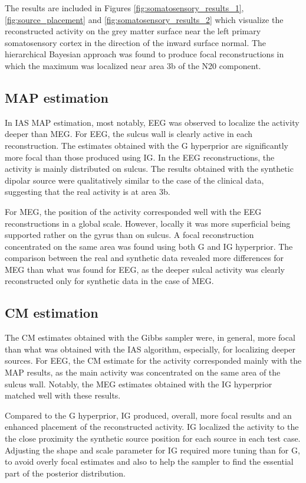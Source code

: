 \documentclass[5p]{elsarticle}
\begin{document}
The results are included in Figures \ref{fig:somatosensory_results_1}, \ref{fig:source_placement} and \ref{fig:somatosensory_results_2} which visualize the reconstructed activity on the grey matter surface near the left primary somatosensory cortex in the direction of the inward surface normal. The hierarchical Bayesian approach was found to produce focal reconstructions in which the maximum was localized near area 3b of the N20 component. 

\subsection{MAP estimation}

In IAS MAP estimation, most notably, EEG was observed to localize the activity deeper than MEG. For EEG, the sulcus wall is clearly active in each reconstruction. The estimates obtained with the G hyperprior are significantly more focal than those produced using IG. In the EEG 
reconstructions, the activity is mainly distributed on sulcus. 
The results obtained with the synthetic dipolar source were qualitatively similar to the case of the clinical data, suggesting that the real activity is at area 3b. 

For MEG, the position of the activity corresponded well with the EEG reconstructions in a global scale. However, locally it was more superficial being supported rather on the gyrus than on sulcus. A focal reconstruction concentrated on the same area was found using both G and IG hyperprior. The comparison between the real and synthetic data revealed more differences for MEG than what was found for EEG, as the deeper sulcal activity was clearly reconstructed only for synthetic data in the case of MEG. 

\subsection{CM estimation}

The CM estimates obtained with the Gibbs sampler were, in general, more focal than what was obtained with the IAS algorithm, especially, for localizing deeper sources. For EEG, the CM estimate for the activity corresponded mainly with the MAP results, as the main activity was concentrated on the same area of the sulcus wall. Notably, the MEG estimates obtained with the IG hyperprior matched well with these results. 

Compared to the G hyperprior, IG  produced, overall, more focal results and an enhanced placement of the reconstructed activity. IG localized the activity to the the close proximity the synthetic source position for each source in each test case.  Adjusting the shape and scale parameter for IG required more tuning than for G, to avoid overly focal estimates and also to help the sampler to find the essential part of the posterior distribution. 
\end{document}
